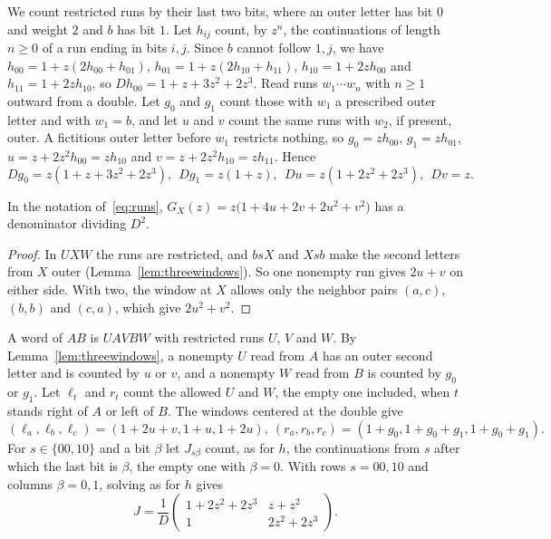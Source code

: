 We count restricted runs by their last two bits, where an outer letter has bit $0$ and weight
$2$ and $b$ has bit $1$. Let $h_{ij}$ count, by $z^n$, the continuations of length $n\ge0$ of a
run ending in bits $i,j$. Since $b$ cannot follow $1,j$, we have $h_{00}=1+z(2h_{00}+h_{01})$,
$h_{01}=1+z(2h_{10}+h_{11})$, $h_{10}=1+2zh_{00}$ and $h_{11}=1+2zh_{10}$, so
$Dh_{00}=1+z+3z^2+2z^3$. Read runs $w_1\cdots w_n$ with $n\ge1$ outward from a double. Let $g_0$
and $g_1$ count those with $w_1$ a prescribed outer letter and with $w_1=b$, and let $u$ and $v$
count the same runs with $w_2$, if present, outer. A fictitious outer letter before $w_1$
restricts nothing, so $g_0=zh_{00}$, $g_1=zh_{01}$, $u=z+2z^2h_{00}=zh_{10}$ and
$v=z+2z^2h_{10}=zh_{11}$. Hence
\begin{equation}\label{eq:runs}
Dg_0=z(1+z+3z^2+2z^3),\ \ Dg_1=z(1+z),\ \ Du=z(1+2z^2+2z^3),\ \ Dv=z.
\end{equation}

\begin{proposition}\label{prop:GX}
In the notation of~\eqref{eq:runs}, $G_X(z)=z\bigl(1+4u+2v+2u^2+v^2\bigr)$ has a denominator
dividing $D^2$.
\end{proposition}

\begin{proof}
In $UXW$ the runs are restricted, and $bsX$ and $Xsb$ make the second letters from $X$ outer
(Lemma~\ref{lem:threewindows}). So one nonempty run gives $2u+v$ on either side. With
two, the window at $X$ allows only the neighbor pairs $(a,c)$, $(b,b)$ and $(c,a)$, which give $2u^2+v^2$.
\end{proof}

A word of $AB$ is $UAVBW$ with restricted runs $U$, $V$ and $W$. By
Lemma~\ref{lem:threewindows}, a nonempty $U$ read from $A$ has an outer second letter and is
counted by $u$ or $v$, and a nonempty $W$ read from $B$ is counted by $g_0$ or $g_1$. Let
$\ell_t$ and $r_t$ count the allowed $U$ and $W$, the empty one included, when $t$ stands
right of $A$ or left of $B$. The windows centered at the double give
\begin{equation}\label{eq:lr}
(\ell_a,\ell_b,\ell_c)=(1+2u+v,1+u,1+2u),\ (r_a,r_b,r_c)=(1+g_0,1+g_0+g_1,1+g_0+g_1).
\end{equation}
For $s\in\{00,10\}$ and a bit $\beta$ let $J_{s\beta}$ count, as for $h$, the continuations
from $s$ after which the last bit is $\beta$, the empty one with $\beta=0$. With rows $s=00,10$
and columns $\beta=0,1$, solving as for $h$ gives
\begin{equation}\label{eq:J}
J=\frac1D\begin{pmatrix}1+2z^2+2z^3&z+z^2\\1&2z^2+2z^3\end{pmatrix}.
\end{equation}

